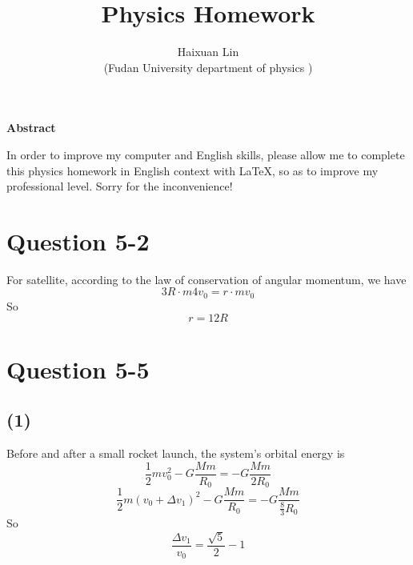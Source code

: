 \documentclass[12pt,a4paper,twocolumn]{article}%
\title{\fontsize{18pt}{27pt}\selectfont%
	{\heiti%
		Physics Homework}}%
\author{\fontsize{12pt}{18pt}\selectfont%
	{\fangsong%
	Haixuan Lin}\\%
	\fontsize{10.5pt}{15.75pt}\selectfont%
	{\fangsong%
		(Fudan University department of physics
		)}}%
\date{}%
\begin{document}
	\maketitle%
	\lhead{}%
	\chead{}%
	\rhead{}%
	\lfoot{}%
	\cfoot{\thepage}%
	\rfoot{}%
	
	\begin{strip}	
	\begin{center}%
		{\textbf{Abstract}}%
	\end{center}
	\begin{adjustwidth}{1.06cm}{1.06cm}%
		\hspace{1.5em}In order to improve my computer and English skills, please allow me to complete this physics homework in English context with \LaTeX, so as to improve my professional level. Sorry for the inconvenience!
	\end{adjustwidth}
	\end{strip}
	
	
	\clearpage%
	
	
	
		\section{Question 5-2}
		\noindent For satellite, according to the law of conservation of angular momentum, we have
		\begin{equation}
			3R\cdot m4v_0 = r\cdot mv_0
		\end{equation}
		So $$r=12R$$
		
		\section{Question 5-5}
		\subsection*{(1)}
		\noindent Before and after a small rocket launch, the system's orbital energy is
		\begin{equation}
			\frac{1}{2}{mv_0^2}-G\frac{Mm}{R_0}=-G\frac{Mm}{2R_0}
		\end{equation}
		\begin{equation}
			\frac{1}{2}m\left( v_0+\Delta v_1 \right) ^2-G\frac{Mm}{R_0}=-G\frac{Mm}{\frac{8}{3}R_0}
		\end{equation}
		So$$\frac{\Delta v_1}{v_0}=\frac{\sqrt{5}}{2}-1$$
\end{document}
